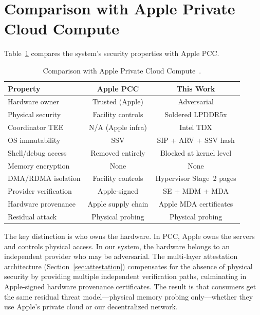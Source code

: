 \documentclass[10pt,twocolumn,letterpaper]{article}
\begin{document}
\section{Comparison with Apple Private Cloud Compute}
\label{sec:pcc-comparison}

Table~\ref{tab:pcc} compares the system's security properties with Apple PCC.

\begin{table}[h]
\centering
\caption{Comparison with Apple Private Cloud Compute~\cite{apple-pcc}.}
\label{tab:pcc}
\vspace{4pt}
\small
\begin{tabular}{@{}lcc@{}}
\toprule
\textbf{Property} & \textbf{Apple PCC} & \textbf{This Work} \\
\midrule
Hardware owner & Trusted (Apple) & Adversarial \\
Physical security & Facility controls & Soldered LPDDR5x \\
Coordinator TEE & N/A (Apple infra) & Intel TDX \\
OS immutability & SSV & SIP + ARV + SSV hash \\
Shell/debug access & Removed entirely & Blocked at kernel level \\
Memory encryption & None & None \\
DMA/RDMA isolation & Facility controls & Hypervisor Stage~2 pages \\
Provider verification & Apple-signed & SE + MDM + MDA \\
Hardware provenance & Apple supply chain & Apple MDA certificates \\
Residual attack & Physical probing & Physical probing \\
\bottomrule
\end{tabular}
\end{table}

The key distinction is who owns the hardware. In PCC, Apple owns the servers and controls physical access. In our system, the hardware belongs to an independent provider who may be adversarial. The multi-layer attestation architecture (Section~\ref{sec:attestation}) compensates for the absence of physical security by providing multiple independent verification paths, culminating in Apple-signed hardware provenance certificates. The result is that consumers get the same residual threat model---physical memory probing only---whether they use Apple's private cloud or our decentralized network.
\end{document}
